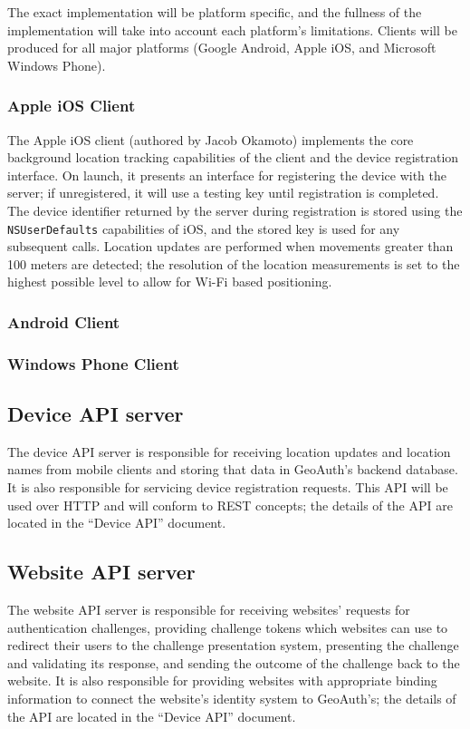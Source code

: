 \documentclass[11pt]{article} %
\begin{document}
The exact implementation will be platform specific, and the fullness of the implementation will take into account each platform's limitations. Clients will be produced for all major platforms (Google Android, Apple iOS, and Microsoft Windows Phone).

\subsubsection{Apple iOS Client}
The Apple iOS client (authored by Jacob Okamoto) implements the core background location tracking capabilities of the client and the device registration interface. On launch, it presents an interface for registering the device with the server; if unregistered, it will use a testing key until registration is completed. The device identifier returned by the server during registration is stored using the \texttt{NSUserDefaults} capabilities of iOS, and the stored key is used for any subsequent calls. Location updates are performed when movements greater than 100 meters are detected; the resolution of the location measurements is set to the highest possible level to allow for Wi-Fi based positioning.

\subsubsection{Android Client}

\subsubsection{Windows Phone Client}

\subsection{Device API server}
The device API server is responsible for receiving location updates and location names from mobile clients and storing that data in GeoAuth's backend database. It is also responsible for servicing device registration requests. This API will be used over HTTP and will conform to REST concepts; the details of the API are located in the ``Device API'' document.

\subsection{Website API server}
The website API server is responsible for receiving websites' requests for authentication challenges, providing challenge tokens which websites can use to redirect their users to the challenge presentation system, presenting the challenge and validating its response, and sending the outcome of the challenge back to the website. It is also responsible for providing websites with appropriate binding information to connect the website's identity system to GeoAuth's; the details of the API are located in the ``Device API'' document.
\end{document}
